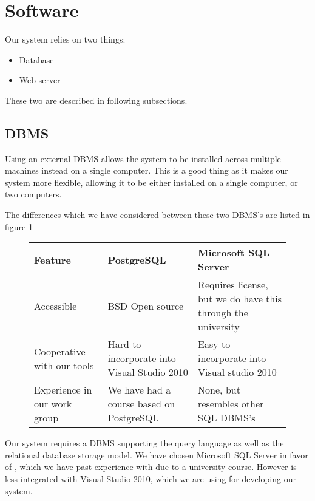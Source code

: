 \section{Software}
\label{sec:software}

Our system relies on two things:

\begin{itemize}
	\item Database
	\item Web server
\end{itemize}

These two are described in following subsections.

\subsection{DBMS}
\label{subsec:dbms}

Using an external DBMS allows the system to be installed across multiple machines instead on a single computer. This is a good thing as it makes our system more flexible, allowing it to be either installed on a single computer, or two computers.

The differences which we have considered between these two DBMS's are listed in figure \ref{fig:DBMS}\cite{postgres08}

\begin{figure}[htb]
	\centering
		\begin{tabularx}{\textwidth}{L|L|L}
			\textbf{Feature}&\textbf{PostgreSQL}&\textbf{Microsoft SQL Server} \\
			\hline
			Accessible&BSD Open source&Requires license, but we do have this through the university \\
			Cooperative with our tools&Hard to incorporate into Visual Studio 2010&Easy to incorporate into Visual studio 2010 \\
			Experience in our work group&We have had a course based on PostgreSQL&None, but resembles other SQL DBMS's \\
		\end{tabularx}
	\label{fig:DBMS}
\end{figure}

Our system requires a DBMS supporting the query language \sql[] as well as the relational database storage model.
We have chosen Microsoft SQL Server in favor of \posgresql[], which we have past experience with due to a university course.
However \posgresql[] is less integrated with Visual Studio 2010, which we are using for developing our system.

